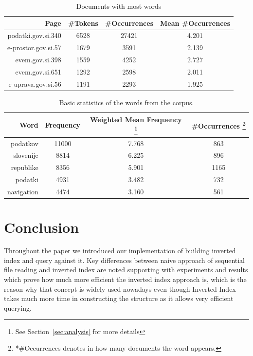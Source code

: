 \documentclass{article}
\begin{document}
	\begin{table}[hbt!]
		\centering
		\begin{tabular}{r|c|c|c}
			Page  &  \#Tokens  &  \#Occurrences  &  Mean  \#Occurrences\\
			\hline
			podatki.gov.si.340 & 6528 & 27421 & 4.201 \\
			e-prostor.gov.si.57 & 1679 & 3591 & 2.139 \\
			evem.gov.si.398 & 1559 & 4252 & 2.727 \\
			evem.gov.si.651 & 1292 & 2598 & 2.011 \\
			e-uprava.gov.si.56 & 1191 & 2293 & 1.925 \\
		\end{tabular}
		\caption{Documents with most words}
		\label{tab:1}
	\end{table}
	
	\begin{table}[hbt!]
		\centering
		\begin{tabular}{r|c|c|c}
			Word  &  Frequency  &  Weighted Mean Frequency \footnote{See Section~\ref{sec:analysis} for more details}  &  \#Occurrences \footnote{*\#Occurrences denotes in how many documents the word appears.} \\
			\hline
			podatkov & 11000  &  7.768  &  863 \\
			slovenije & 8814 & 6.225 & 896 \\
			republike & 8356 & 5.901 & 1165 \\
			podatki & 4931 & 3.482 & 732 \\
			navigation & 4474 & 3.160 & 561 \\
		\end{tabular}
		\caption{Basic statistics of the words from the corpus. }
		\label{tab:2}
	\end{table}
	
	\section{Conclusion}
	Throughout the paper we introduced our implementation of building inverted index and query against it. Key differences between naive approach of sequential file reading and inverted index are noted supporting with experiments and results which prove how much more efficient the inverted index approach is, which is the reason why that concept is widely used nowadays even though Inverted Index takes much more time in constructing the structure as it allows very efficient querying.
	
	
\end{document}
